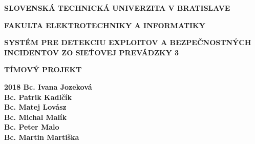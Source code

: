 \documentclass[a4paper,12pt]{article}
\begin{document}
\begin{titlepage}
	\centering
	
	{\bfseries SLOVENSKÁ TECHNICKÁ UNIVERZITA  V BRATISLAVE\par}
	{\bfseries FAKULTA ELEKTROTECHNIKY A INFORMATIKY\par}
	\vspace{8cm}
	{\bfseries SYSTÉM PRE DETEKCIU EXPLOITOV A BEZPEČNOSTNÝCH INCIDENTOV ZO SIEŤOVEJ PREVÁDZKY 3\par}
	\vspace{0.5cm}
	{\bfseries TÍMOVÝ PROJEKT\par}
	\vspace{10cm}
	{\bfseries 2018 	\hfill \bfseries {Bc. Ivana Jozeková}} \\
	{ \hfill \bfseries {Bc. Patrik Kadlčík}} \\
	{ \hfill \bfseries {Bc. Matej Lovász}} \\
	{ \hfill \bfseries {Bc. Michal Malík}} \\ 
	{ \hfill \bfseries {Bc. Peter Malo}} \\
	{ \hfill \bfseries {Bc. Martin Martiška}}
	
\end{titlepage}

\newpage
\end{document}
